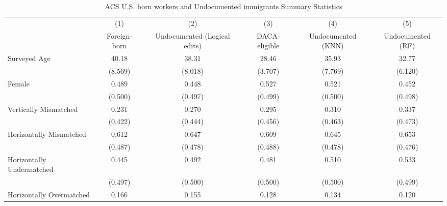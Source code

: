 \begin{table}[htbp]\centering
\def\sym#1{\ifmmode^{#1}\else\(^{#1}\)\fi}
\caption{ACS U.S. born workers and Undocumented immigrants Summary Statistics \label{tab:sum}}
\begin{tabular}{l*{5}{c}}
\hline\hline
                    &\multicolumn{1}{c}{(1)}         &\multicolumn{1}{c}{(2)}         &\multicolumn{1}{c}{(3)}         &\multicolumn{1}{c}{(4)}         &\multicolumn{1}{c}{(5)}         \\
                    &Foreign-born         &Undocumented (Logical edits)         &DACA-eligible         &Undocumented (KNN)         &Undocumented (RF)         \\
\hline
Surveyed Age        &       40.18         &       38.31         &       28.46         &       35.93         &       32.77         \\
                    &     (8.569)         &     (8.018)         &     (3.707)         &     (7.769)         &     (6.120)         \\
[1em]
Female              &       0.489         &       0.448         &       0.527         &       0.521         &       0.452         \\
                    &     (0.500)         &     (0.497)         &     (0.499)         &     (0.500)         &     (0.498)         \\
[1em]
Vertically Mismatched&       0.231         &       0.270         &       0.295         &       0.310         &       0.337         \\
                    &     (0.422)         &     (0.444)         &     (0.456)         &     (0.463)         &     (0.473)         \\
[1em]
Horizontally Mismatched&       0.612         &       0.647         &       0.609         &       0.645         &       0.653         \\
                    &     (0.487)         &     (0.478)         &     (0.488)         &     (0.478)         &     (0.476)         \\
[1em]
Horizontally Undermatched&       0.445         &       0.492         &       0.481         &       0.510         &       0.533         \\
                    &     (0.497)         &     (0.500)         &     (0.500)         &     (0.500)         &     (0.499)         \\
[1em]
Horizontally Overmatched&       0.166         &       0.155         &       0.128         &       0.134         &       0.120         \\

\end{tabular}
\end{table}
